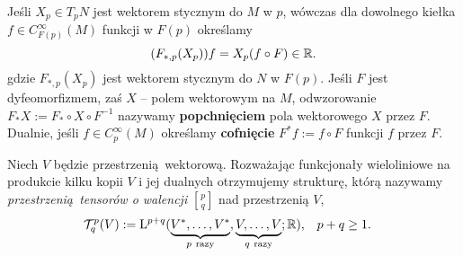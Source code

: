 Jeśli \(X_p\in T_p N\) jest wektorem stycznym do \(M\) w \(p\), wówczas dla dowolnego kiełka \(f\in C_{F(p)}^\infty(M)\) funkcji w \(F(p)\) określamy 
\begin{equation*}
(F_{\ast, p} (X_p))f = X_p(f\circ F) \in \mathbb{R}.
\end{equation*} 
gdzie \(F_{\ast, p} (X_p)\) jest wektorem stycznym do \(N\) w \(F(p)\). Jeśli \(F\) jest dyfeomorfizmem, zaś \(X\) -- polem wektorowym na \(M\), odwzorowanie \(F_\ast X := F_\ast \circ X \circ F^{-1}\) nazywamy \textbf{popchnięciem} pola wektorowego \(X\) przez \(F\). Dualnie, jeśli \(f\in C_p^\infty(M)\) określamy \textbf{cofnięcie} \(F^\ast f := f\circ F\) funkcji \(f\) przez \(F\).


Niech \(V\) będzie przestrzenią wektorową. Rozważając funkcjonały wieloliniowe na produkcie kilku kopii \(V\) i jej dualnych otrzymujemy strukturę, którą nazywamy \emph{przestrzenią tensorów o walencji} \({p \brack q}\) nad przestrzenią \(V\),
\begin{align*}
    \mathcal{T}_q^p(V) := \mathrm{L}^{p+q}(\underbrace{V^\ast, \dots, V^\ast}_{p\ \text{razy}} ,\underbrace{V,\dots, V}_{q\ \text{razy}}; \mathbb{R}) , &\quad p+q\geq 1.
\end{align*}
